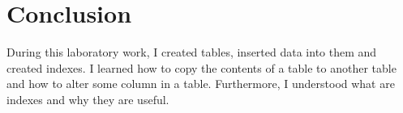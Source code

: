 \section*{Conclusion}

During this laboratory work, I created tables, inserted data into them and created indexes. I learned how to copy the contents of a table to another table and how to alter some column in a table. Furthermore, I understood what are indexes and why they are useful. 

\bigskip